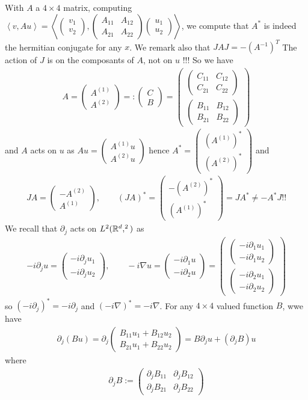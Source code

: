 \documentclass[11pt,a4paper,reqno,french,tikz]{amsart}
\let\C\relax\newcommand{\C}{\mathbb{C}}\newcommand{\Z}{\mathbb{Z}}\newcommand{\R}{\mathbb{R}}\newcommand{\N}{\mathbb{N}}\newcommand{\Q}{\mathbb{Q}}\newcommand{\bbM}{\mathbb{M}}
\newcommand{\pa}[1]{\left( #1 \right)} %
\newcommand{\ps}[1]{\left< #1 \right>} %
\newcommand{\na}{\nabla} %
\newcommand{\mat}[1]{\begin{pmatrix} #1 \end{pmatrix}} %
\begin{document}
With $A$ a $4 \times 4$ matrix, computing $\ps{v, A u} = \ps{\mat{v_1 \\ v_2},\mat{A_{11} & A_{12} \\ A_{21} & A_{22}} \mat{u_1\\u_2}}$, we compute that $A^*$ is indeed the hermitian conjugate for any $x$. We remark also that $J A J = - \pa{A^{-1}}^T$
The action of $J$ is on the composants of $A$, not on $u$ !!! So we have 
\begin{align*}
A = \mat{A^{(1)} \\ A^{(2)}} =: \mat{C \\ B} = \mat{\mat{C_{11} & C_{12} \\ C_{21} & C_{22}} \\ \mat{B_{11} & B_{12} \\ B_{21} & B_{22}}}
\end{align*}
and $A$ acts on $u$ as $A u = \mat{A^{(1)} u \\ A^{(2)} u}$ hence $A^* = \mat{\pa{A^{(1)}}^* \\ \pa{A^{(2)}}^*}$ and
\begin{align*}
JA = \mat{-A^{(2)} \\ A^{(1)}}, \qquad \pa{JA}^* = \mat{-\pa{A^{(2)}}^* \\ \pa{A^{(1)}}^*} = J A^* \neq -A^* J !!
\end{align*}
We recall that $\partial_j$ acts on $L^2(\R^d,\C^2)$ as
\begin{align*}
-i \partial_j u = \mat{-i\partial_j u_1 \\ -i\partial_j u_2}, \qquad -i\na u = \mat{-i\partial_1 u \\ -i\partial_2 u} = \mat{\mat{-i\partial_1 u_1 \\ -i\partial_1 u_2} \\ \mat{-i\partial_2 u_1 \\ -i\partial_2 u_2}}
\end{align*}
so $\pa{-i\partial_j}^* = -i\partial_j$ and $\pa{-i\na}^* = -i\na$. For any $4\times 4$ valued function $B$, wwe have
\begin{align*}
\partial_j \pa{B u} = \partial_j \mat{B_{11} u_1 + B_{12} u_2 \\ B_{21} u_1 + B_{22} u_2} = B \partial_j u + \pa{\partial_j B}u 
\end{align*}
where
\begin{align*}
	\partial_j B := \mat{\partial_j B_{11} & \partial_j B_{12} \\ \partial_j B_{21} & \partial_j B_{22}}
\end{align*}
\end{document}
